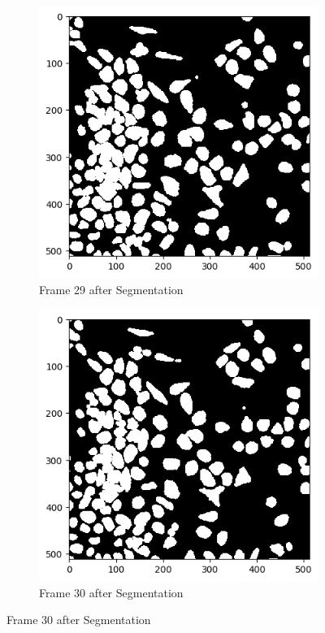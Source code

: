 \documentclass{article}
\begin{document}
\begin{figure}[h!]
  \begin{subfigure}{0.4\textwidth}
    \includegraphics[width=\linewidth]{Report/Appendix_Images/Segmentation-A-Control/frame_29.png}
    \caption*{Frame 29 after Segmentation}
  \end{subfigure}
  \hfill
  \begin{subfigure}{0.4\textwidth}
    \includegraphics[width=\linewidth]{Report/Appendix_Images/Segmentation-A-Control/frame_30.png}
    \caption*{Frame 30 after Segmentation}
  \end{subfigure}
\end{figure}
\clearpage
\end{document}
